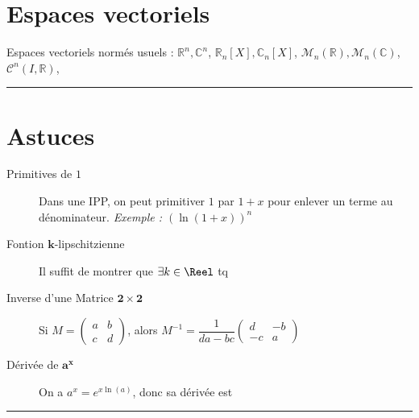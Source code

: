 \documentclass[11pt,a4paper,fleqn,pdftex]{report}
\begin{document}
\section{Espaces vectoriels} %
\label{sum:espaces_vectoriels}
   Espaces vectoriels normés usuels : \newline
   $\mathbb{R}^n, \mathbb{C}^n$, $\mathbb{R}_n[X], \mathbb{C}_n[X]$, $\mathcal{M}_n(\mathbb{R}), \mathcal{M}_n(\mathbb{C})$, $\mathcal{C}^n(I, \mathbb{R})$, 
\rule{\columnwidth}{0.5pt}
\section{Astuces}
\begin{description}
\item[Primitives de $1$] Dans une IPP, on peut primitiver $1$ par $1+x$ pour enlever un terme au dénominateur. \textit{Exemple : $\left( \ln(1+x)\right) ^n$}
\item[Fontion $\boldsymbol{k}$-lipschitzienne] Il suffit de montrer que $\exists k\in \Reel$ tq 
\item[Inverse d'une Matrice $\boldsymbol{2\times 2}$] Si $M = \begin{pmatrix}
a & b \\ 
c & d
\end{pmatrix}$, alors $M^{-1} =  \dfrac{1}{da - bc}\begin{pmatrix}
d & -b \\ 
-c & a
\end{pmatrix}$
\item[Dérivée de $\boldsymbol{a^x}$] On a $a^x = e^{x \ln (a)} $, donc sa dérivée est 
\end{description}
\rule{\columnwidth }{0.5pt}

\printnoidxglossary[type=\acronymtype,style=longragged,title={Liste des acronymes}]
\printindex
\end{document}
